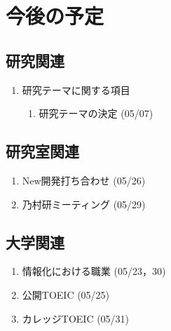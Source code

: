 \documentclass[fleqn, 14pt]{extarticle}
\begin{document}
\section{今後の予定}
\label{sec-4}
\subsection{研究関連}
\label{sec-4-1}

\begin{enumerate}
\item 研究テーマに関する項目
\hfill
\begin{enumerate}

\item 研究テーマの決定
\hfill
(05/07)

\end{enumerate}
\end{enumerate}

\subsection{研究室関連}
\label{sec-4-2}

\begin{enumerate}
\item New開発打ち合わせ
\hfill
\label{enum-3}
(05/26)
\item 乃村研ミーティング
\hfill
\label{enum-4}
(05/29)
\end{enumerate}
\subsection{大学関連}
\begin{enumerate}
\item 情報化における職業
\hfill
\label{enum-5}
(05/23，30)
\item 公開TOEIC
\hfill
\label{enum-6}
(05/25)
\item カレッジTOEIC
\hfill
\label{enum-7}
(05/31)
\end{enumerate}
\end{document}
